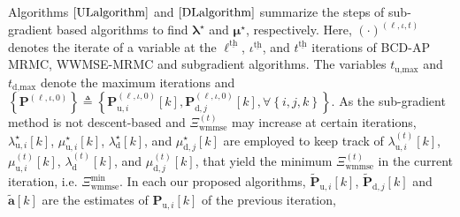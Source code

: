 \documentclass[10pt,journal]{IEEEtran}
\newcommand{\paren}[1]{\left({#1}\right)}
\newcommand{\bracket}[1]{{\left [{#1}\right ]}}
\newcommand{\braces}[1]{{\left\{ {#1}\right\}}}
\newcommand{\ith}[1]    {{#1}^{\underline{\text{th}}}}
\newcommand{\PiB}{\mathbf{P}_{\textrm{u},i}\bracket{k}}
\theoremstyle{definition}
\begin{document}
		Algorithms $\ref{ULalgorithm}$ and $\ref{DLalgorithm}$ summarize the steps of sub-gradient based algorithms to find $\boldsymbol{\lambda}^\star$ and $\boldsymbol{\mu}^\star$, respectively. Here, $(\cdot)^{\paren{\ell,\iota,t}}$ denotes the iterate of a variable at the $\ith{\ell}$, $\ith{\iota}$, and $\ith{t}$  iterations of BCD-AP MRMC, WWMSE-MRMC and subgradient algorithms. The variables $t_{\textrm{u,max}}$ and $t_{\textrm{d,max}}$ denote the maximum iterations and $\braces{\mathbf{P}^{\paren{\ell,\iota,0}}}\triangleq\braces{\mathbf{P}^{\paren{\ell,\iota,0}}_{\textrm{u},i}\bracket{k},\mathbf{P}^{\paren{\ell,\iota,0}}_{\textrm{d},j}\bracket{k},\forall \braces{i,j,k}}$. As the sub-gradient method is not descent-based and $\Xi^{\paren{t}}_{\textrm{wmmse}}$ may increase at certain iterations\cite{Lui2006subg}, $\lambda^{\star}_{\textrm{u},i}\bracket{k}$, $\mu^\star_{\textrm{u},i}\bracket{k}$, $\lambda^{\star}_{\textrm{d}}\bracket{k}$, and $\mu^\star_{\textrm{d},j}\bracket{k}$ are employed to keep track of $\lambda^{\paren{t}}_{\textrm{u},i}\bracket{k}$, $\mu^{\paren{t}}_{\textrm{u},i}\bracket{k}$, $\lambda^{\paren{t}}_{\textrm{d}}\bracket{k}$, and $\mu^{\paren{t}}_{\textrm{d},j}\bracket{k}$,  that yield the minimum $\Xi^{\paren{t}}_{\textrm{wmmse}}$ in the current iteration, i.e.  $\Xi^{\textrm{min}}_{\textrm{wmmse}}$. In each our proposed algorithms, $\widetilde{\mathbf{P}}_{\textrm{u},i}\bracket{k}$, $\widetilde{\mathbf{P}}_{\textrm{d},j}\bracket{k}$ and $\widetilde{\mathbf{a}}\bracket{k}$ are the estimates of $\PiB$ of the previous iteration,
\end{document}
